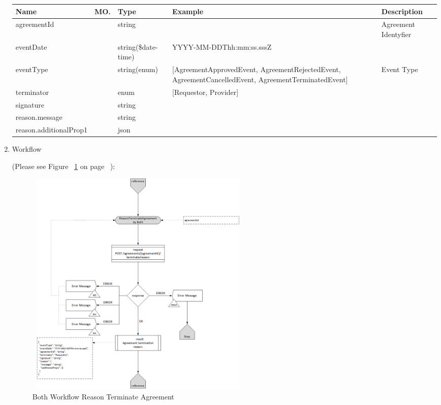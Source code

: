 \begin{enumerate}
\begin{table}[H]
\begin{center}
\begin{tabular}{|p{3cm}|l|p{3cm}|p{3cm}|p{4cm}|} 
\hline
\rowcolor{lightgray}	Name	& MO.	& Type	& Example & 	Description \\
\hline
agreementId		& 	& 	string				&								&	Agreement Identyfier \\ 
\hline
eventDate		& 	& 	string(\$date-time)	&	YYYY-MM-DDThh:mm:ss.sssZ	&	 \\ 
\hline
eventType		& 	& 	string(enum)		&	[AgreementApprovedEvent, AgreementRejectedEvent, AgreementCancelledEvent, AgreementTerminatedEvent] &	Event Type \\ 
\hline
terminator 		&	&	enum 				& [Requestor, Provider]			&				\\
\hline
signature 		&	&	string 				&								&				\\
\hline
reason.message 	&	&	string 				&								&				\\
\hline
reason.additionalProp1	&	&	json 			&								&				\\
\hline

\end{tabular}
\end{center}

\end{table}

\item Workflow

(Please see Figure ~\ref{fig:BRTA} on page ~\pageref{fig:BRTA}):

\begin{figure}[H]
    \centering
    \includegraphics[width=11cm,height=11cm,angle=0]{./diag/Workflow/Market/ReasonTerminateAgreement-B-Workflow.png}
    \caption{Both Workflow Reason Terminate Agreement  }
	\label{fig:BRTA}
\end{figure}

\end{enumerate}

